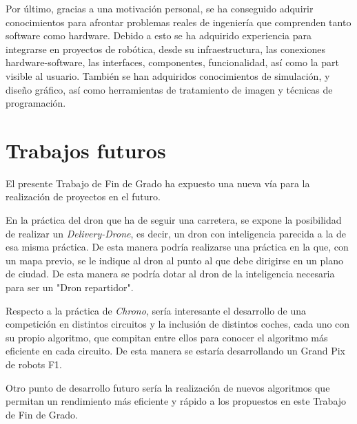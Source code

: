 Por último, gracias a una motivación personal, se ha conseguido adquirir conocimientos para afrontar problemas reales de ingeniería que comprenden tanto software como hardware. Debido a esto se ha adquirido experiencia para integrarse en proyectos de robótica, desde su infraestructura, las conexiones hardware-software, las interfaces, componentes, funcionalidad, así como la part visible al usuario. También se han adquiridos conocimientos de simulación, y diseño gráfico, así como herramientas de tratamiento de imagen y técnicas de programación.

\section{Trabajos futuros} 
El presente Trabajo de Fin de Grado ha expuesto una nueva vía para la realización de proyectos en el futuro.

En la práctica del dron que ha de seguir una carretera, se expone la posibilidad de realizar un \textit{Delivery-Drone}, es decir, un dron con inteligencia parecida a la de esa misma práctica. De esta manera podría realizarse una práctica en la que, con un mapa previo, se le indique al dron al punto al que debe dirigirse en un plano de ciudad. De esta manera se podría dotar al dron de la inteligencia necesaria para ser un "Dron repartidor".

Respecto a la práctica de \textit{Chrono}, sería interesante el desarrollo de una competición en distintos circuitos y la inclusión de distintos coches, cada uno con su propio algoritmo, que compitan entre ellos para conocer el algoritmo más eficiente en cada circuito. De esta manera se estaría desarrollando un Grand Pix de robots F1.

Otro punto de desarrollo futuro sería la realización de nuevos algoritmos que permitan un rendimiento más eficiente y rápido a los propuestos en este Trabajo de Fin de Grado.